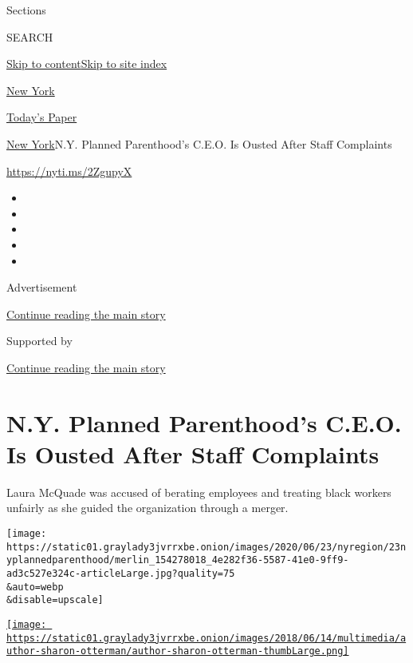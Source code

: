 Sections

SEARCH

\protect\hyperlink{site-content}{Skip to
content}\protect\hyperlink{site-index}{Skip to site index}

\href{https://www.nytimes3xbfgragh.onion/section/nyregion}{New York}

\href{https://myaccount.nytimes3xbfgragh.onion/auth/login?response_type=cookie\&client_id=vi}{}

\href{https://www.nytimes3xbfgragh.onion/section/todayspaper}{Today's
Paper}

\href{/section/nyregion}{New York}\textbar{}N.Y. Planned Parenthood's
C.E.O. Is Ousted After Staff Complaints

\url{https://nyti.ms/2ZgupyX}

\begin{itemize}
\item
\item
\item
\item
\item
\end{itemize}

Advertisement

\protect\hyperlink{after-top}{Continue reading the main story}

Supported by

\protect\hyperlink{after-sponsor}{Continue reading the main story}

\hypertarget{ny-planned-parenthoods-ceo-is-ousted-after-staff-complaints}{%
\section{N.Y. Planned Parenthood's C.E.O. Is Ousted After Staff
Complaints}\label{ny-planned-parenthoods-ceo-is-ousted-after-staff-complaints}}

Laura McQuade was accused of berating employees and treating black
workers unfairly as she guided the organization through a merger.

\texttt{[image: https://static01.graylady3jvrrxbe.onion/images/2020/06/23/nyregion/23nyplannedparenthood/merlin\_154278018\_4e282f36-5587-41e0-9ff9-ad3c527e324c-articleLarge.jpg?quality=75\\\&auto=webp\\\&disable=upscale]}

\href{https://www.nytimes3xbfgragh.onion/by/sharon-otterman}{\texttt{[image: https://static01.graylady3jvrrxbe.onion/images/2018/06/14/multimedia/author-sharon-otterman/author-sharon-otterman-thumbLarge.png]}}

